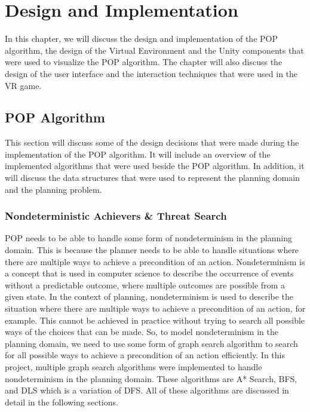 \chapter{Design and Implementation}
\label{chap:design_and_implementation}

In this chapter, we will discuss the design and implementation of the \ac{POP} algorithm, the design of the Virtual Environment  and the Unity components that were used to visualize the \ac{POP} algorithm. The chapter will also discuss the design of the user interface and the interaction techniques that were used in the \ac{VR} game.

\section[POP Algorithm]{\ac{POP} Algorithm} \label{sec:pop_algorithm_design}

This section will discuss some of the design decisions that were made during the implementation of the \ac{POP} algorithm. It will include an overview of the implemented algorithms that were used beside the \ac{POP} algorithm. In addition, it will discuss the data structures that were used to represent the planning domain and the planning problem.

\subsection{Nondeterministic Achievers \& Threat Search} \label {subsec:nondeterministic_achievers_threat_search}
\acf{POP} needs to be able to handle some form of nondeterminism in the planning domain. This is because the planner needs
to be able to handle situations where there are multiple ways to achieve a precondition
of an action. Nondeterminism is a concept that is used in computer science to describe the occurrence of events without a predictable outcome, where multiple outcomes are possible from a given state. In the context of planning, nondeterminism is used to describe the situation where there are multiple ways to achieve a precondition of an action, for example.
This cannot be achieved in practice without trying to search all possible ways of the choices that can be made.
So, to model nondeterminism in the planning domain, we need to use some form of graph search algorithm to search for all possible ways to achieve a precondition of an action efficiently. In this project, multiple graph search algorithms were implemented to handle nondeterminism in the planning domain. These algorithms are \ac{A*} Search, \ac{BFS}, and \ac{DLS} which is a variation of \ac{DFS}. All of these algorithms are discussed in detail in the following sections.


